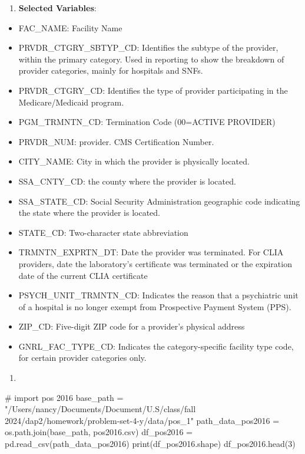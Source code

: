 \documentclass[
  letterpaper,
  DIV=11,
  numbers=noendperiod]{scrartcl}
\newenvironment{Shaded}{\begin{snugshade}}{\end{snugshade}}
\newcommand{\BuiltInTok}[1]{\textcolor[rgb]{0.00,0.23,0.31}{#1}}
\newcommand{\CommentTok}[1]{\textcolor[rgb]{0.37,0.37,0.37}{#1}}
\newcommand{\DecValTok}[1]{\textcolor[rgb]{0.68,0.00,0.00}{#1}}
\newcommand{\NormalTok}[1]{\textcolor[rgb]{0.00,0.23,0.31}{#1}}
\newcommand{\OperatorTok}[1]{\textcolor[rgb]{0.37,0.37,0.37}{#1}}
\newcommand{\StringTok}[1]{\textcolor[rgb]{0.13,0.47,0.30}{#1}}
\providecommand{\tightlist}{%
  \setlength{\itemsep}{0pt}\setlength{\parskip}{0pt}}\usepackage{longtable,booktabs,array}
\begin{document}
\begin{enumerate}
\def\labelenumi{\arabic{enumi}.}
\tightlist
\item
  \textbf{Selected Variables}:
\end{enumerate}

\begin{itemize}
\tightlist
\item
  FAC\_NAME: Facility Name
\item
  PRVDR\_CTGRY\_SBTYP\_CD: Identifies the subtype of the provider,
  within the primary category. Used in reporting to show the breakdown
  of provider categories, mainly for hospitals and SNFs.
\item
  PRVDR\_CTGRY\_CD: Identifies the type of provider participating in the
  Medicare/Medicaid program.
\item
  PGM\_TRMNTN\_CD: Termination Code (00=ACTIVE PROVIDER)
\item
  PRVDR\_NUM: provider. CMS Certification Number.
\item
  CITY\_NAME: City in which the provider is physically located.
\item
  SSA\_CNTY\_CD: the county where the provider is located.
\item
  SSA\_STATE\_CD: Social Security Administration geographic code
  indicating the state where the provider is located.
\item
  STATE\_CD: Two-character state abbreviation
\item
  TRMNTN\_EXPRTN\_DT: Date the provider was terminated. For CLIA
  providers, date the laboratory's certificate was terminated or the
  expiration date of the current CLIA certificate
\item
  PSYCH\_UNIT\_TRMNTN\_CD: Indicates the reason that a psychiatric unit
  of a hospital is no longer exempt from Prospective Payment System
  (PPS).
\item
  ZIP\_CD: Five-digit ZIP code for a provider's physical address
\item
  GNRL\_FAC\_TYPE\_CD: Indicates the category-specific facility type
  code, for certain provider categories only.
\end{itemize}

\begin{enumerate}
\def\labelenumi{\arabic{enumi}.}
\setcounter{enumi}{1}
\tightlist
\item
\end{enumerate}

\begin{Shaded}
\begin{Highlighting}[]
\CommentTok{\# import pos 2016}
\NormalTok{base\_path }\OperatorTok{=} \StringTok{"/Users/nancy/Documents/Document/U.S/class/fall 2024/dap2/homework/problem{-}set{-}4{-}y/data/pos\_1"}
\NormalTok{path\_data\_pos2016 }\OperatorTok{=}\NormalTok{ os.path.join(base\_path, }\StringTok{\textquotesingle{}pos2016.csv\textquotesingle{}}\NormalTok{)}
\NormalTok{df\_pos2016 }\OperatorTok{=}\NormalTok{ pd.read\_csv(path\_data\_pos2016)}
\BuiltInTok{print}\NormalTok{(df\_pos2016.shape)}
\NormalTok{df\_pos2016.head(}\DecValTok{3}\NormalTok{)}
\end{Highlighting}
\end{Shaded}
\end{document}
